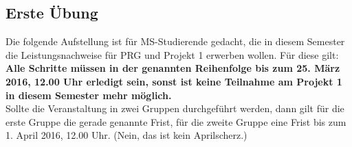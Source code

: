 \subsection{Erste Übung}

Die folgende Aufstellung ist für MS-Studierende gedacht, die in diesem Semester die Leistungsnachweise für PRG und Projekt 1 erwerben wollen. Für diese gilt:\\

\textbf{Alle Schritte müssen in der genannten Reihenfolge bis zum 25. März 2016, 12.00 Uhr erledigt sein, sonst ist keine Teilnahme am Projekt 1 in diesem Semester mehr möglich.}\\

Sollte die Veranstaltung in zwei Gruppen durchgeführt werden, dann gilt für die erste Gruppe die gerade genannte Frist, für die zweite Gruppe eine Frist bis zum 1. April 2016, 12.00 Uhr. (Nein, das ist kein Aprilscherz.)

